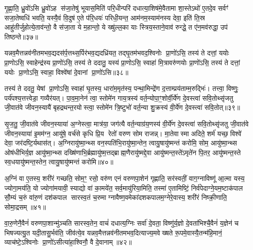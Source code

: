 गृ॒ह्णा॒ति॒ ध्रु॒वो॑ऽसि ध्रु॒वो॑ऽह स॑जा॒तेषु॑ भूयास॒मिति॑ परि॒धीन्परि॑ दधात्या॒शिष॑मे॒वैतामा शा॒स्तेऽथो॑ ए॒तदे॒व सर्वꣳ॑ सजा॒तेष्वधि॑ भवति॒ यस्यै॒वं वि॒दुष॑ ए॒ते प॑रि॒धयः॑ परिधी॒यन्त॒ आम॑नम॒स्याम॑नस्य देवा॒ इति॑ ति॒स्र आहु॑तीर्जुहोत्ये॒ताव॑न्तो॒ वै स॑जा॒ता ये म॒हान्तो॒ ये ख्षु॑ल्ल॒का याः स्त्रिय॒स्ताने॒वाव॑ रुन्द्धे॒ त ए॑न॒मव॑रुद्धा॒ उप॑ तिष्ठन्ते॥३७॥

{\anuvakamend[{स्वाहाम॑नमसि सजा॒तानाꣳ॑ रुन्द्धे॒ पञ्च॑ च॥९॥}]}

यन्नव॒मैत्तन्नव॑नीतमभव॒द्यदस॑र्प॒त्तथ्स॒र्पिर॑भव॒द्यदध्रि॑यत॒ तद्घृ॒तम॑भवद॒श्विनोः प्रा॒णो॑ऽसि॒ तस्य॑ ते दत्तां॒ ययोः प्रा॒णोऽसि॒ स्वाहेन्द्र॑स्य प्रा॒णो॑ऽसि॒ तस्य॑ ते ददातु॒ यस्य॑ प्रा॒णोऽसि॒ स्वाहा॑ मि॒त्रावरु॑णयोः प्रा॒णो॑ऽसि॒ तस्य॑ ते दत्तां॒ ययोः प्रा॒णोऽसि॒ स्वाहा॒ विश्वे॑षां दे॒वानां प्रा॒णो॑ऽसि॥३८॥

तस्य॑ ते ददतु॒ येषां प्रा॒णोऽसि॒ स्वाहा॑ घृ॒तस्य॒ धारा॑म॒मृत॑स्य॒ पन्था॒मिन्द्रे॑ण द॒त्ताम्प्रय॑ताम्म॒रुद्भिः॑। तत्त्वा॒ विष्णुः॒ पर्य॑पश्य॒त्तत्त्वेडा॒ गव्यैर॑यत्। पा॒व॒मा॒नेन॑ त्वा॒ स्तोमे॑न गाय॒त्रस्य॑ वर्त॒न्योपा॒ꣳ॒शोर्वी॒र्ये॑ण दे॒वस्त्वा॑ सवि॒तोथ्सृ॑जतु जी॒वात॑वे जीवन॒स्यायै॑ बृहद्रथन्त॒रयोस्त्वा॒ स्तोमे॑न त्रि॒ष्टुभो॑ वर्त॒न्या शु॒क्रस्य॑ वी॒र्ये॑ण दे॒वस्त्वा॑ सवि॒तोत्॥३९॥

सृ॒ज॒तु॒ जी॒वात॑वे जीवन॒स्याया॑ अ॒ग्नेस्त्वा॒ मात्र॑या॒ जग॑त्यै वर्त॒न्याग्र॑य॒णस्य॑ वी॒र्ये॑ण दे॒वस्त्वा॑ सवि॒तोथ्सृ॑जतु जी॒वात॑वे जीवन॒स्याया॑ इ॒मम॑ग्न॒ आयु॑षे॒ वर्च॑से कृधि प्रि॒य रेतो॑ वरुण सोम राजन्न्। मा॒तेवास्मा अदिते॒ शर्म॑ यच्छ॒ विश्वे॑ देवा॒ जर॑दष्टि॒र्यथास॑त्। अ॒ग्निरायु॑ष्मा॒न्थ्स वन॒स्पति॑भि॒रायु॑ष्मा॒न्तेन॒ त्वायु॒षायु॑ष्मन्तं करोमि॒ सोम॒ आयु॑ष्मा॒न्थ्स ओष॑धीभिर्य॒ज्ञ आयु॑ष्मा॒न्थ्स दख्षि॑णाभि॒र्ब्रह्मायु॑ष्म॒त्तद्ब्राह्म॒णैरायु॑ष्मद्दे॒वा आयु॑ष्मन्त॒स्ते॑ऽमृते॑न पि॒तर॒ आयु॑ष्मन्त॒स्ते स्व॒धयायु॑ष्मन्त॒स्तेन॒ त्वायु॒षायु॑ष्मन्तं करोमि॥४०॥

{\anuvakamend[{विश्वे॑षां दे॒वानां प्रा॒णो॑ऽसि त्रि॒ष्टुभो॑ वर्त॒न्या शु॒क्रस्य॑ वी॒र्ये॑ण दे॒वस्त्वा॑ सवि॒तोत्सोम॒ आयु॑ष्मा॒न्पञ्च॑विशतिश्च॥10॥}]}

अ॒ग्निं वा ए॒तस्य॒ शरी॑रं गच्छति॒ सोम॒ꣳ॒ रसो॒ वरु॑ण एनं वरुणपा॒शेन॑ गृह्णाति॒ सर॑स्वतीं॒ वाग॒ग्नाविष्णू॑ आ॒त्मा यस्य॒ ज्योगा॒मय॑ति॒ यो ज्योगा॑मयावी॒ स्याद्यो वा॑ का॒मये॑त॒ सर्व॒मायु॑रिया॒मिति॒ तस्मा॑ ए॒तामिष्टिं॒ निर्व॑पेदाग्ने॒यम॒ष्टाक॑पाल सौ॒म्यं च॒रुं वा॑रु॒णं दश॑कपाल सारस्व॒तं च॒रुमाग्नावैष्ण॒वमेका॑दशकपालम॒ग्नेरे॒वास्य॒ शरी॑रं निष्क्री॒णाति॒ सोमा॒द्रसम्॥४१॥

वा॒रु॒णेनै॒वैनं॑ वरुणपा॒शान्मु॑ञ्चति सारस्व॒तेन॒ वाचं॑ दधात्य॒ग्निः सर्वा॑ दे॒वता॒ विष्णु॑र्य॒ज्ञो दे॒वता॑भिश्चै॒वैनं॑ य॒ज्ञेन॑ च भिषज्यत्यु॒त यदी॒तासु॒र्भव॑ति॒ जीव॑त्ये॒व यन्नव॒मैत्तन्नव॑नीतमभव॒दित्याज्य॒मवेख्षते रू॒पमे॒वास्यै॒तन्म॑हि॒मानं॒ व्याच॑ष्टे॒ऽश्विनोः प्रा॒णो॑ऽसीत्या॑हा॒श्विनौ॒ वै दे॒वानाम्॥४२॥

